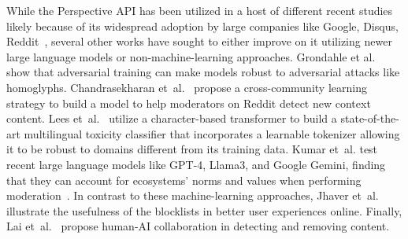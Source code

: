 While the Perspective API has been utilized in a host of different recent studies~\cite{kumar2021designing,saveski2021structure,jain2018adversarial,rieder2021fabrics} likely because of its widespread adoption by large companies like Google, Disqus, Reddit~\cite{perspectiveapi}, several other works have sought to either improve on it utilizing newer large language models or non-machine-learning approaches. Grondahle et al.~\cite{grondahl2018all} show that adversarial training can make models robust to adversarial attacks like homoglyphs. Chandrasekharan et~al.~\cite{chandrasekharan2019crossmod} propose a cross-community learning strategy to build a model to help moderators on Reddit detect new context content. Lees et~al.~\cite{lees2022new} utilize a character-based transformer to build a state-of-the-art multilingual toxicity classifier that incorporates a learnable tokenizer allowing it to be robust to domains different from its training data. Kumar et~al. test recent large language models like GPT-4, Llama3, and Google Gemini, finding that they can account for ecosystems' norms and values when performing moderation~\cite{kumar2023understanding}. In contrast to these machine-learning approaches, Jhaver et~al.~\cite{jhaver2018online} illustrate the usefulness of the blocklists in better user experiences online. Finally, Lai et~al.~\cite{lai2022human} propose human-AI collaboration in detecting and removing content. 


